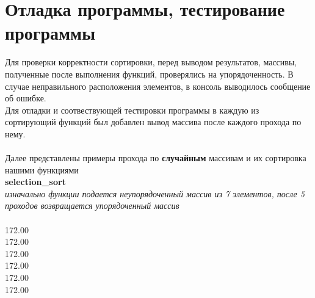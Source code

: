 \documentclass[a4paper,11pt]{article}
\begin{document}
    \section{Отладка программы, тестирование программы}
    \vspace{0,5cm}
    Для проверки корректности сортировки, перед выводом результатов, массивы, полученные после выполнения функций, проверялись на упорядоченность. В случае неправильного расположения  элементов, в консоль выводилось сообщение об ошибке.\\
    Для отладки и соотвествующей тестировки программы в каждую из сортирующий функций был добавлен вывод массива после каждого прохода по нему.\\ 
    \vspace{0.2 cm}\\
    Далее представлены примеры прохода по \textbf{случайным} массивам и их сортировка нашими функциями\\
    
    \textbf{selection\_sort} \\
    \textit{изначально функции подается неупорядоченный массив из 7 элементов, после 5 проходов возвращается упорядоченный массив}\\
    \vspace{0.1cm}\\
    172.00\qquad \\
    172.00\qquad \\
    172.00\qquad \\
    172.00\qquad \\
    172.00\qquad \\
    172.00\qquad \\
    
\end{document}
